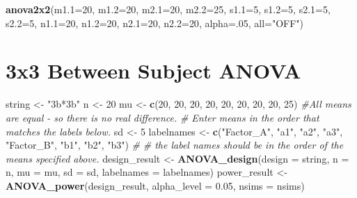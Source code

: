 \documentclass[]{book}
\newenvironment{Shaded}{\begin{snugshade}}{\end{snugshade}}
\newcommand{\CommentTok}[1]{\textcolor[rgb]{0.56,0.35,0.01}{\textit{#1}}}
\newcommand{\DataTypeTok}[1]{\textcolor[rgb]{0.13,0.29,0.53}{#1}}
\newcommand{\DecValTok}[1]{\textcolor[rgb]{0.00,0.00,0.81}{#1}}
\newcommand{\FloatTok}[1]{\textcolor[rgb]{0.00,0.00,0.81}{#1}}
\newcommand{\KeywordTok}[1]{\textcolor[rgb]{0.13,0.29,0.53}{\textbf{#1}}}
\newcommand{\NormalTok}[1]{#1}
\newcommand{\StringTok}[1]{\textcolor[rgb]{0.31,0.60,0.02}{#1}}
\begin{document}
\begin{Shaded}
\begin{Highlighting}[]
\KeywordTok{anova2x2}\NormalTok{(}\DataTypeTok{m1.1=}\DecValTok{20}\NormalTok{,}
         \DataTypeTok{m1.2=}\DecValTok{20}\NormalTok{,}
         \DataTypeTok{m2.1=}\DecValTok{20}\NormalTok{,}
         \DataTypeTok{m2.2=}\DecValTok{25}\NormalTok{, }
         \DataTypeTok{s1.1=}\DecValTok{5}\NormalTok{,}
         \DataTypeTok{s1.2=}\DecValTok{5}\NormalTok{,}
         \DataTypeTok{s2.1=}\DecValTok{5}\NormalTok{,}
         \DataTypeTok{s2.2=}\DecValTok{5}\NormalTok{,}
         \DataTypeTok{n1.1=}\DecValTok{20}\NormalTok{,}
         \DataTypeTok{n1.2=}\DecValTok{20}\NormalTok{,}
         \DataTypeTok{n2.1=}\DecValTok{20}\NormalTok{,}
         \DataTypeTok{n2.2=}\DecValTok{20}\NormalTok{, }
         \DataTypeTok{alpha=}\NormalTok{.}\DecValTok{05}\NormalTok{, }
         \DataTypeTok{all=}\StringTok{"OFF"}\NormalTok{)}
\end{Highlighting}
\end{Shaded}

\hypertarget{x3-between-subject-anova}{%
\section{3x3 Between Subject ANOVA}\label{x3-between-subject-anova}}

\begin{Shaded}
\begin{Highlighting}[]
\NormalTok{string <-}\StringTok{ "3b*3b"}
\NormalTok{n <-}\StringTok{ }\DecValTok{20}
\NormalTok{mu <-}\StringTok{ }\KeywordTok{c}\NormalTok{(}\DecValTok{20}\NormalTok{, }\DecValTok{20}\NormalTok{, }\DecValTok{20}\NormalTok{, }\DecValTok{20}\NormalTok{, }\DecValTok{20}\NormalTok{, }\DecValTok{20}\NormalTok{, }\DecValTok{20}\NormalTok{, }\DecValTok{20}\NormalTok{, }\DecValTok{25}\NormalTok{) }\CommentTok{#All means are equal - so there is no real difference.}
\CommentTok{# Enter means in the order that matches the labels below.}
\NormalTok{sd <-}\StringTok{ }\DecValTok{5}
\NormalTok{labelnames <-}\StringTok{ }\KeywordTok{c}\NormalTok{(}\StringTok{"Factor_A"}\NormalTok{, }\StringTok{"a1"}\NormalTok{, }\StringTok{"a2"}\NormalTok{, }\StringTok{"a3"}\NormalTok{, }\StringTok{"Factor_B"}\NormalTok{, }\StringTok{"b1"}\NormalTok{, }\StringTok{"b2"}\NormalTok{, }\StringTok{"b3"}\NormalTok{) }\CommentTok{#}
\CommentTok{# the label names should be in the order of the means specified above.}
\NormalTok{design_result <-}\StringTok{ }\KeywordTok{ANOVA_design}\NormalTok{(}\DataTypeTok{design =}\NormalTok{ string,}
                   \DataTypeTok{n =}\NormalTok{ n, }
                   \DataTypeTok{mu =}\NormalTok{ mu, }
                   \DataTypeTok{sd =}\NormalTok{ sd, }
                   \DataTypeTok{labelnames =}\NormalTok{ labelnames)}
\NormalTok{power_result <-}\StringTok{ }\KeywordTok{ANOVA_power}\NormalTok{(design_result, }\DataTypeTok{alpha_level =} \FloatTok{0.05}\NormalTok{, }\DataTypeTok{nsims =}\NormalTok{ nsims)}
\end{Highlighting}
\end{Shaded}
\end{document}
